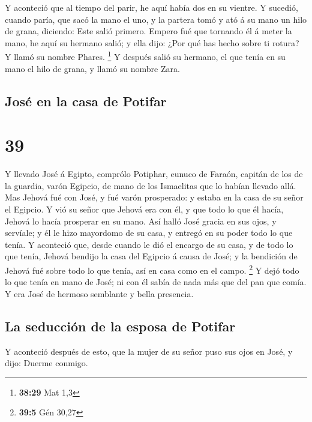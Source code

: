  Y aconteció que al tiempo del parir, he aquí había dos
en su vientre.  Y sucedió, cuando paría, que sacó la mano
el uno, y la partera tomó y ató á su mano un hilo de grana, diciendo:
Este salió primero.  Empero fué que tornando él á meter
la mano, he aquí su hermano salió; y ella dijo: ¿Por qué has hecho sobre
ti rotura? Y llamó su nombre Phares. \footnote{\textbf{38:29} Mat 1,3}
 Y después salió su hermano, el que tenía en su mano el
hilo de grana, y llamó su nombre Zara.

\hypertarget{josuxe9-en-la-casa-de-potifar}{%
\subsection{José en la casa de
Potifar}\label{josuxe9-en-la-casa-de-potifar}}

\hypertarget{section-38}{%
\section{39}\label{section-38}}

 Y llevado José á Egipto, comprólo Potiphar, eunuco de
Faraón, capitán de los de la guardia, varón Egipcio, de mano de los
Ismaelitas que lo habían llevado allá.  Mas Jehová fué con
José, y fué varón prosperado: y estaba en la casa de su señor el
Egipcio.  Y vió su señor que Jehová era con él, y que todo
lo que él hacía, Jehová lo hacía prosperar en su mano. 
Así halló José gracia en sus ojos, y servíale; y él le hizo mayordomo de
su casa, y entregó en su poder todo lo que tenía.  Y
aconteció que, desde cuando le dió el encargo de su casa, y de todo lo
que tenía, Jehová bendijo la casa del Egipcio á causa de José; y la
bendición de Jehová fué sobre todo lo que tenía, así en casa como en el
campo. \footnote{\textbf{39:5} Gén 30,27}  Y dejó todo lo
que tenía en mano de José; ni con él sabía de nada más que del pan que
comía. Y era José de hermoso semblante y bella presencia.

\hypertarget{la-seducciuxf3n-de-la-esposa-de-potifar}{%
\subsection{La seducción de la esposa de
Potifar}\label{la-seducciuxf3n-de-la-esposa-de-potifar}}

 Y aconteció después de esto, que la mujer de su señor
puso sus ojos en José, y dijo: Duerme conmigo.

